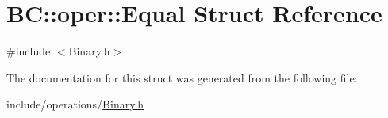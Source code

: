 \hypertarget{structBC_1_1oper_1_1Equal}{}\section{BC\+:\+:oper\+:\+:Equal Struct Reference}
\label{structBC_1_1oper_1_1Equal}


{\ttfamily \#include $<$Binary.\+h$>$}



The documentation for this struct was generated from the following file\+:\begin{DoxyCompactItemize}
\item 
include/operations/\hyperlink{Binary_8h}{Binary.\+h}\end{DoxyCompactItemize}
